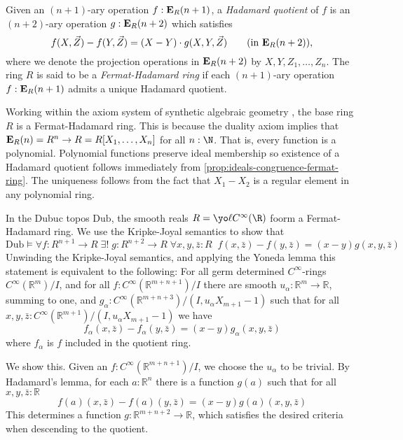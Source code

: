 {\begin{definition}
  \label{def:hadamard-quotient}
  Given an \((n+1)\)-ary operation \(f:\mathbf{E}_R(n+1)\), a \emph{Hadamard quotient} of \(f\) is an \((n+2)\)-ary operation \(g : \mathbf{E}_R(n+2)\) which satisfies
  \[
    f(X,\vec Z) - f(Y,\vec Z) = (X-Y)\cdot g(X,Y,\vec Z) \qquad \text{(in \(\mathbf{E}_R(n+2)\))},
  \]
  where we denote the projection operations in \(\mathbf{E}_R(n+2)\) by \(X,Y,Z_1,\dots,Z_n\).
  The ring \(R\) is said to be a \emph{Fermat-Hadamard ring} if each \((n+1)\)-ary operation \(f:\mathbf{E}_R(n+1)\) admits a unique Hadamard quotient.
\end{definition}

\begin{example}
  Working within the axiom system of synthetic algebraic geometry \cite{draft}, the base ring \(R\) is a Fermat-Hadamard ring.
  This is because the duality axiom implies that \(\mathbf{E}_R(n) = R^n \to R = R[X_1, \ldots, X_n]\) for all \(n : \N\).
  That is, every function is a polynomial.
  Polynomial functions preserve ideal membership so existence of a Hadamard quotient follows immediately from \ref{prop:ideals-congruence-fermat-ring}.
  The uniqueness follows from the fact that \(X_1 - X_2\) is a regular element in any polynomial ring.
\end{example}

\begin{example}
  In the Dubuc topos \(\mathrm{Dub}\), the smooth reals \(R = \yo \ell C^\infty(\R)\) foorm a Fermat-Hadamard ring.
  We use the Kripke-Joyal semantics to show that 
  \[ \mathrm{Dub} \models \forall f : R^{n+1} \to R \; 
                          \exists ! \; g : R^{n+2} \to R  \;
                          \forall x, y , \bar{z}  : R \; \;
                           f(x, \bar{z}) - f(y, \bar{z}) = (x-y)g(x,y,\bar{z})\]
  Unwinding the Kripke-Joyal semantics, and applying the Yoneda lemma this statement is equivalent to the following:
  For all germ determined \(C^\infty\)-rings \(C^\infty(\mathbb{R}^m)/I\), and for all \(f : C^{\infty}(\mathbb{R}^{m+n+1})/I\) there are smooth \(u_{\alpha}: \mathbb{R}^{m}\to \mathbb{R}\), summing to one, 
  and \(g_{\alpha}: C^\infty(\mathbb{R}^{m+n+3})/(I, u_{\alpha}X_{m+1}-1)\) such that for all \(x,y,\bar z : C^\infty(\mathbb{R}^{m+1})/(I, u_{\alpha}X_{m+1}-1)\) we have 
  \[f_\alpha(x, \bar{z}) - f_\alpha(y, \bar{z}) = (x-y)g_\alpha(x,y,\bar{z})\] 
  where \(f_\alpha\) is \(f\) included in the quotient ring.

We show this. Given an \(f : C^\infty(\mathbb{R}^{m+n+1})/I\), we choose the \(u_\alpha\) to be trivial.
By Hadamard's lemma, for each \(a : \mathbb{R}^n\) there is a function \(g(a)\) such that for all \(x, y, \bar{z} : \mathbb{R}\) 
\[f(a)(x, \bar{z}) - f(a)(y, \bar{z}) = (x-y)g(a)(x,y,\bar{z})\]
This determines a function \(g : \mathbb{R}^{m+n+2} \to \mathbb{R}\), which satisfies the desired criteria when descending to the quotient.


\end{example}}

